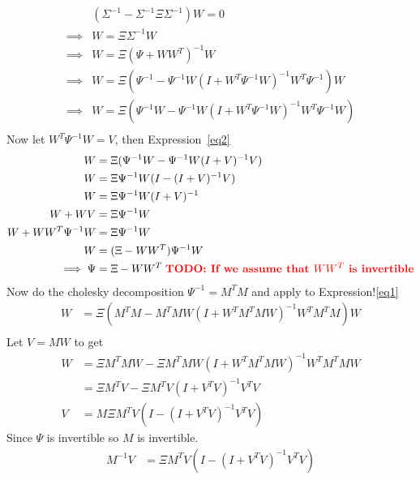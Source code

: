 \documentclass[11pt]{article}
\newcommand{\todo}[1]{\textbf{\textcolor{red}{TODO: #1}}}
\begin{document}
\begin{align}
           & (\Sigma^{-1}  - \Sigma^{-1}\Xi\Sigma^{-1})W = 0           \\
  \implies & W = \Xi\Sigma^{-1}W \\
  \implies & W = \Xi(\Psi + WW^T)^{-1}W \\
  \implies & W = \Xi(\Psi^{-1} - \Psi^{-1} W(I+W^T\Psi^{-1}W)^{-1}W^T\Psi^{-1})W \label{eq1}\\
  \implies & W = \Xi(\Psi^{-1}W - \Psi^{-1} W(I+W^T\Psi^{-1}W)^{-1}W^T\Psi^{-1}W) \label{eq2}\\
\end{align}
Now let $W^T\Psi^{-1}W = V$, then Expression~\ref{eq2}
\begin{align}
  W &= \Xi(\Psi^{-1}W - \Psi^{-1} W(I+V)^{-1}V) \\
  W &= \Xi\Psi^{-1}W(I - (I+V)^{-1}V)\\
  W &= \Xi\Psi^{-1}W(I + V)^{-1}\\
  W +WV &= \Xi \Psi^{-1}W\\
  W + WW^T\Psi^{-1}W &= \Xi \Psi^{-1}W\\
  W &= (\Xi - WW^T) \Psi^{-1}W\\
  \implies \Psi &= \Xi - WW^T \;\text{\todo{If we assume that $WW^T$ is invertible}}\\
\end{align}
Now do the cholesky decomposition $\Psi^{-1} = M^TM$ and apply to Expression!\ref{eq1}
\begin{align}
  W &= \Xi(M^TM - M^T M W(I+W^T M^T MW)^{-1}W^T M^T M)W \\
\end{align}
Let $V = MW$ to get
\begin{align}
  W &= \Xi M^TMW - \Xi M^T M W(I+W^T M^T MW)^{-1}W^T M^T MW \\
  &= \Xi M^TV - \Xi M^T V(I+V^TV)^{-1}V^T V \\
  V &= M\Xi M^TV(I - (I+V^TV)^{-1}V^TV)
\end{align}
Since $\Psi$ is invertible so $M$ is invertible.
\begin{align}
  M^{-1}V &= \Xi M^TV(I - (I+V^TV)^{-1}V^TV)
\end{align}
\end{document}
